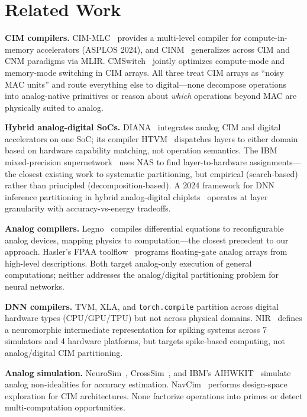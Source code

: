 \documentclass[11pt]{article}
\begin{document}
\section{Related Work}
\label{sec:related}

\textbf{CIM compilers.} CIM-MLC~\cite{cimmlc2024} provides a multi-level compiler for compute-in-memory accelerators (ASPLOS 2024), and CINM~\cite{cinm2024} generalizes across CIM and CNM paradigms via MLIR. CMSwitch~\cite{cmswitch2025} jointly optimizes compute-mode and memory-mode switching in CIM arrays. All three treat CIM arrays as ``noisy MAC units'' and route everything else to digital---none decompose operations into analog-native primitives or reason about \textit{which} operations beyond MAC are physically suited to analog.

\textbf{Hybrid analog-digital SoCs.} DIANA~\cite{diana2022} integrates analog CIM and digital accelerators on one SoC; its compiler HTVM~\cite{htvm2023} dispatches layers to either domain based on hardware capability matching, not operation semantics. The IBM mixed-precision supernetwork~\cite{ibm_supernetwork2026} uses NAS to find layer-to-hardware assignments---the closest existing work to systematic partitioning, but empirical (search-based) rather than principled (decomposition-based). A 2024 framework for DNN inference partitioning in hybrid analog-digital chiplets~\cite{hybrid_partition2024} operates at layer granularity with accuracy-vs-energy tradeoffs.

\textbf{Analog compilers.} Legno~\cite{legno2020} compiles differential equations to reconfigurable analog devices, mapping physics to computation---the closest precedent to our approach. Hasler's FPAA toolflow~\cite{hasler2020} programs floating-gate analog arrays from high-level descriptions. Both target analog-only execution of general computations; neither addresses the analog/digital partitioning problem for neural networks.

\textbf{DNN compilers.} TVM, XLA, and \texttt{torch.compile} partition across digital hardware types (CPU/GPU/TPU) but not across physical domains. NIR~\cite{nir2024} defines a neuromorphic intermediate representation for spiking systems across 7 simulators and 4 hardware platforms, but targets spike-based computing, not analog/digital CIM partitioning.

\textbf{Analog simulation.} NeuroSim~\cite{neurosim}, CrossSim~\cite{crosssim}, and IBM's AIHWKIT~\cite{aihwkit2023} simulate analog non-idealities for accuracy estimation. NavCim~\cite{navcim2024} performs design-space exploration for CIM architectures. None factorize operations into primes or detect multi-computation opportunities.
\end{document}
